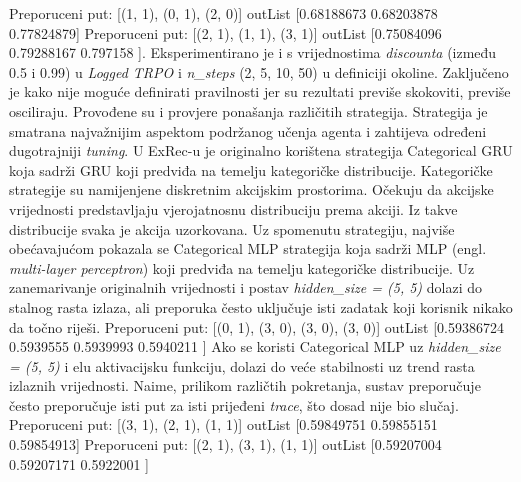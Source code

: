 Preporuceni put: [(1, 1), (0, 1), (2, 0)]\newline
outList [0.68188673 0.68203878 0.77824879]\newline
Preporuceni put: [(2, 1), (1, 1), (3, 1)]\newline
outList [0.75084096 0.79288167 0.797158 ].\newline
Eksperimentirano je i s vrijednostima \textit{discounta} (između 0.5 i 0.99) u \textit{Logged TRPO} i \textit{n\_steps} (2, 5, 10, 50) u definiciji okoline. Zaključeno je kako nije moguće definirati pravilnosti jer su rezultati previše skokoviti, previše osciliraju.\newline
Provođene su i provjere ponašanja različitih strategija. Strategija je smatrana najvažnijim aspektom podržanog učenja agenta i zahtijeva određeni dugotrajniji \textit{tuning}. U ExRec-u je originalno korištena strategija Categorical GRU koja sadrži GRU koji predviđa na temelju kategoričke distribucije. Kategoričke strategije su namijenjene diskretnim akcijskim prostorima. Očekuju da akcijske vrijednosti predstavljaju vjerojatnosnu distribuciju prema akciji. Iz takve distribucije svaka je akcija uzorkovana. \newline
Uz spomenutu strategiju, najviše obećavajućom pokazala se Categorical MLP strategija koja sadrži MLP (engl. \textit{multi-layer perceptron}) koji predviđa na temelju kategoričke distribucije. Uz zanemarivanje originalnih vrijednosti i postav \textit{hidden\_size = (5, 5)} dolazi do stalnog rasta izlaza, ali preporuka često uključuje isti zadatak koji korisnik nikako da točno riješi.\newline
Preporuceni put: [(0, 1), (3, 0), (3, 0), (3, 0)]\newline
outList [0.59386724 0.5939555  0.5939993  0.5940211 ]\newline
Ako se koristi Categorical MLP uz \textit{hidden\_size = (5, 5)} i elu aktivacijsku funkciju, dolazi do veće stabilnosti uz trend rasta izlaznih vrijednosti. Naime, prilikom različtih pokretanja, sustav preporučuje često preporučuje isti put za isti prijeđeni \textit{trace}, što dosad nije bio slučaj.\newline
Preporuceni put: [(3, 1), (2, 1), (1, 1)]\newline
outList [0.59849751 0.59855151 0.59854913]\newline
Preporuceni put: [(2, 1), (3, 1), (1, 1)]\newline
outList [0.59207004 0.59207171 0.5922001 ]\newline

